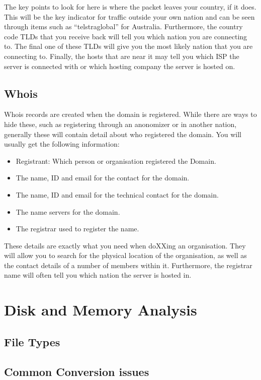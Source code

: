 \documentclass[a4paper,11pt]{report}
\begin{document}
			The key points to look for here is where the packet leaves your country, if it does. 
			This will be the key indicator for traffic outside your own nation and can be seen through items such as ``telstraglobal'' for Australia. 
			Furthermore, the country code TLDs that you receive back will tell you which nation you are connecting to. 
			The final one of these TLDs will give you the most likely nation that you are connecting to. 
			Finally, the hosts that are near it may tell you which ISP the server is connected with or which hosting company the server is hosted on. 

		\subsection{Whois}
			Whois records are created when the domain is registered. 
			While there are ways to hide these, such as registering through an anonomizer or in another nation, generally these will contain detail about who registered the domain. 
			You will usually get the following information:
			\begin{itemize}
				\item Registrant: Which person or organisation registered the Domain. 
				\item The name, ID and email for the contact for the domain. 
				\item The name, ID and email for the technical contact for the domain.
				\item The name servers for the domain.
				\item The registrar used to register the name. 
			\end{itemize}
			These details are exactly what you need when doXXing an organisation. 
			They will allow you to search for the physical location of the organisation, as well as the contact details of a number of members within it. 
			Furthermore, the registrar name will often tell you which nation the server is hosted in. 
	\section{Disk and Memory Analysis}
		\subsection{File Types}
		\subsection{Common Conversion issues}
\end{document}
